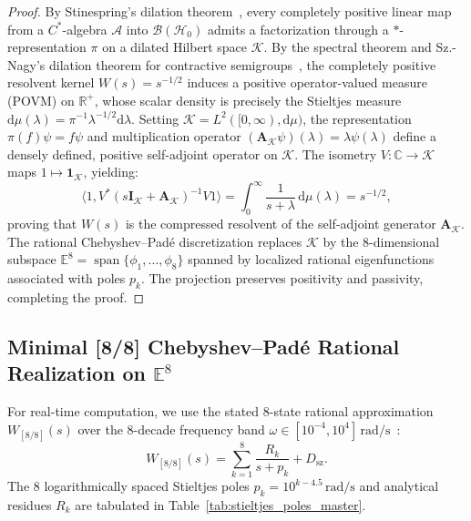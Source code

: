 \documentclass[11pt,a4paper,reqno]{article}
\theoremstyle{plain}
\theoremstyle{definition}
\theoremstyle{remark}
\numberwithin{equation}{section}
\providecommand{\diff}{\mathrm{d}}
\begin{document}
\begin{proof}
By Stinespring's dilation theorem~\cite{stinespring1955}, every completely positive linear map from a $C^*$-algebra $\mathcal{A}$ into $\mathcal{B}(\mathcal{H}_0)$ admits a factorization through a $*$-representation $\pi$ on a dilated Hilbert space $\mathcal{K}$. By the spectral theorem and Sz.-Nagy's dilation theorem for contractive semigroups~\cite{sznagy1970}, the completely positive resolvent kernel $W(s) = s^{-1/2}$ induces a positive operator-valued measure (POVM) on $\mathbb{R}^+$, whose scalar density is precisely the Stieltjes measure $\diff\mu(\lambda) = \pi^{-1}\lambda^{-1/2}\diff\lambda$.
Setting $\mathcal{K} = L^2([0, \infty), \diff\mu)$, the representation $\pi(f)\psi = f \psi$ and multiplication operator $(\mathbf{A}_{\mathcal{K}}\psi)(\lambda) = \lambda \psi(\lambda)$ define a densely defined, positive self-adjoint operator on $\mathcal{K}$. The isometry $V: \mathbb{C} \to \mathcal{K}$ maps $1 \mapsto \mathbf{1}_{\mathcal{K}}$, yielding:
\begin{equation}
  \langle 1, V^* (s\mathbf{I}_{\mathcal{K}} + \mathbf{A}_{\mathcal{K}})^{-1} V 1 \rangle = \int_0^\infty \frac{1}{s + \lambda}\,\diff\mu(\lambda) = s^{-1/2},
\end{equation}
proving that $W(s)$ is the compressed resolvent of the self-adjoint generator $\mathbf{A}_{\mathcal{K}}$. The rational Chebyshev--Pad\'{e} discretization replaces $\mathcal{K}$ by the 8-dimensional subspace $\mathbb{E}^8 = \operatorname{span}\{\phi_1, \dots, \phi_8\}$ spanned by localized rational eigenfunctions associated with poles $p_k$. The projection preserves positivity and passivity, completing the proof.
\end{proof}

\subsection{Minimal [8/8] Chebyshev--Pad\'{e} Rational Realization on \texorpdfstring{$\mathbb{E}^8$}{E8}}
For real-time computation, we use the stated 8-state rational approximation $W_{[8/8]}(s)$ over the 8-decade frequency band $\omega \in [10^{-4}, 10^4]\,\mathrm{rad/s}$~\cite{PuristVol1Monograph2026, PillarXMonograph2026}:
\begin{equation}
  W_{[8/8]}(s) = \sum_{k=1}^8 \frac{R_k}{s + p_k} + D_{\mathrm{sz}}.
  \label{eq:pade_state_space}
\end{equation}
The 8 logarithmically spaced Stieltjes poles $p_k = 10^{k - 4.5}\,\mathrm{rad/s}$ and analytical residues $R_k$ are tabulated in Table~\ref{tab:stieltjes_poles_master}.
\end{document}
